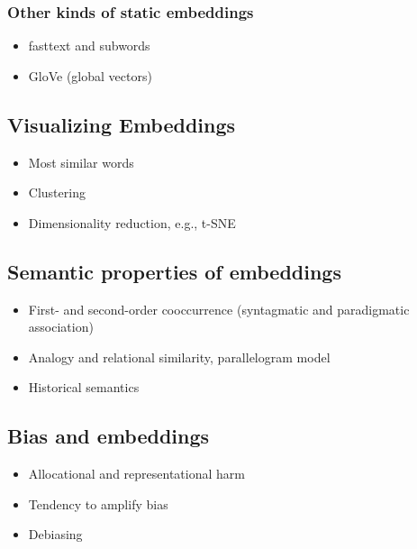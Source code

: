 \subsubsection{Other kinds of static embeddings}

\begin{itemize}
  \item fasttext and subwords
  \item GloVe (global vectors)
\end{itemize}

\subsection{Visualizing Embeddings}

\begin{itemize}
  \item Most similar words
  \item Clustering
  \item Dimensionality reduction, e.g., t-SNE
\end{itemize}

\subsection{Semantic properties of embeddings}

\begin{itemize}
  \item First- and second-order cooccurrence (syntagmatic and paradigmatic association)
  \item Analogy and relational similarity, parallelogram model
  \item Historical semantics
\end{itemize}

\subsection{Bias and embeddings}

\begin{itemize}
  \item Allocational and representational harm
  \item Tendency to amplify bias
  \item Debiasing
\end{itemize}

